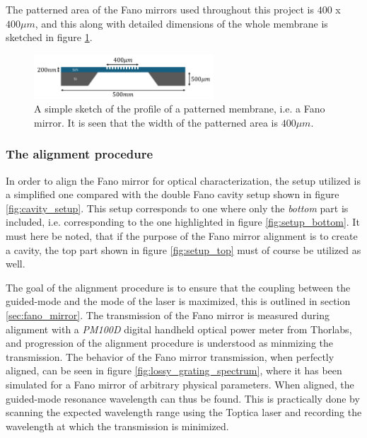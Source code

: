 The patterned area of the Fano mirrors used throughout this project is $400$ x $400 \mu m$, and this along with detailed dimensions of the whole membrane is sketched in figure \ref{fig:grating_sketch}.

\begin{figure}[h!]
    \centering
    \includegraphics[width=0.6\textwidth]{figures/grating_sketch.pdf}
    \caption{A simple sketch of the profile of a patterned membrane, i.e. a Fano mirror. It is seen that the width of the patterned area is $400\mu m$.}
    \label{fig:grating_sketch}
\end{figure}

\subsubsection{The alignment procedure}\label{sec:alignment}

In order to align the Fano mirror for optical characterization, the setup utilized is a simplified one compared with the double Fano cavity setup shown in figure \ref{fig:cavity_setup}. This setup corresponds to one where only the \emph{bottom} part is included, i.e. corresponding to the one highlighted in figure \ref{fig:setup_bottom}. It must here be noted, that if the purpose of the Fano mirror alignment is to create a cavity, the top part shown in figure \ref{fig:setup_top} must of course be utilized as well. 

The goal of the alignment procedure is to ensure that the coupling between the guided-mode and the mode of the laser is maximized, this is outlined in section \ref{sec:fano_mirror}. The transmission of the Fano mirror is measured during alignment with a \emph{PM100D} digital handheld optical power meter from Thorlabs\cite{power_meter}, and progression of the alignment procedure is understood as minmizing the transmission. The behavior of the Fano mirror transmission, when perfectly aligned, can be seen in figure \ref{fig:lossy_grating_spectrum}, where it has been simulated for a Fano mirror of arbitrary physical parameters. When aligned, the guided-mode resonance wavelength can thus be found. This is practically done by scanning the expected wavelength range using the Toptica laser and recording the wavelength at which the transmission is minimized.  

